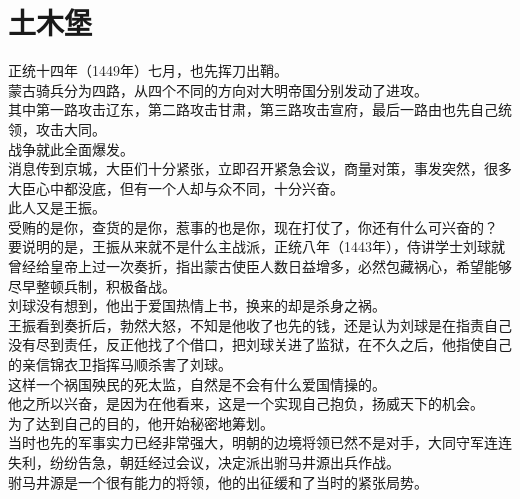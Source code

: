 \section{土木堡}
\ifnum{}
	\begin{multicols}{\theparacolNo}
\fi
正统十四年（1449年）七月，也先挥刀出鞘。\\

蒙古骑兵分为四路，从四个不同的方向对大明帝国分别发动了进攻。\\

其中第一路攻击辽东，第二路攻击甘肃，第三路攻击宣府，最后一路由也先自己统领，攻击大同。\\

战争就此全面爆发。\\

消息传到京城，大臣们十分紧张，立即召开紧急会议，商量对策，事发突然，很多大臣心中都没底，但有一个人却与众不同，十分兴奋。\\

此人又是王振。\\

受贿的是你，查货的是你，惹事的也是你，现在打仗了，你还有什么可兴奋的？\\

要说明的是，王振从来就不是什么主战派，正统八年（1443年），侍讲学士刘球就曾经给皇帝上过一次奏折，指出蒙古使臣人数日益增多，必然包藏祸心，希望能够尽早整顿兵制，积极备战。\\

刘球没有想到，他出于爱国热情上书，换来的却是杀身之祸。\\

王振看到奏折后，勃然大怒，不知是他收了也先的钱，还是认为刘球是在指责自己没有尽到责任，反正他找了个借口，把刘球关进了监狱，在不久之后，他指使自己的亲信锦衣卫指挥马顺杀害了刘球。\\

这样一个祸国殃民的死太监，自然是不会有什么爱国情操的。\\

他之所以兴奋，是因为在他看来，这是一个实现自己抱负，扬威天下的机会。\\

为了达到自己的目的，他开始秘密地筹划。\\

当时也先的军事实力已经非常强大，明朝的边境将领已然不是对手，大同守军连连失利，纷纷告急，朝廷经过会议，决定派出驸马井源出兵作战。\\

驸马井源是一个很有能力的将领，他的出征缓和了当时的紧张局势。\\


\end{multicols}
